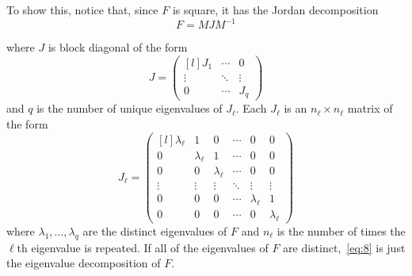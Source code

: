 \documentclass[12pt,fleqn]{article}
\begin{document}
To show this, notice that, since $F$ is square, it has the Jordan
decomposition
\begin{equation}
  \label{eq:8}
  F = M J M^{-1}
\end{equation}

where $J$ is block diagonal of the form
\[
J = \begin{pmatrix*}[l]
  J_1 & \cdots & 0 \\
  \vdots & \ddots & \vdots \\
  0 & \cdots & J_q
\end{pmatrix*}
\]
and $q$ is the number of unique eigenvalues of $J_{\ell}$. Each
$J_\ell$ is an $n_\ell \times n_\ell$ matrix of the form
\[
J_\ell =
\begin{pmatrix*}[l]
  \lambda_\ell & 1 & 0 & \cdots & 0 & 0 \\
  0 & \lambda_\ell & 1 & \cdots & 0 & 0 \\
  0 & 0 & \lambda_\ell & \cdots & 0 & 0 \\
  \vdots & \vdots & \vdots & \ddots & \vdots & \vdots \\
  0 & 0 & 0 & \cdots & \lambda_\ell & 1 \\
  0 & 0 & 0 & \cdots & 0 & \lambda_\ell
\end{pmatrix*}
\]
where $\lambda_1,\dots,\lambda_q$ are the distinct eigenvalues of $F$
and $n_\ell$ is the number of times the $\ell$th eigenvalue is
repeated.  If all of the eigenvalues of $F$ are
distinct,~\eqref{eq:8} is just the eigenvalue decomposition of $F$.
\end{document}
